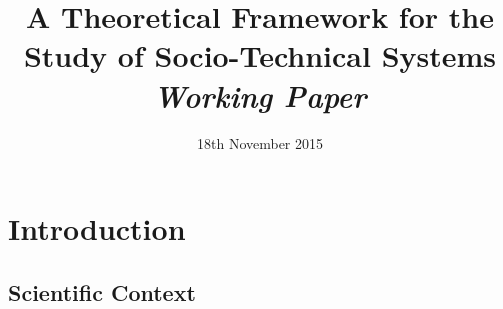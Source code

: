 


\title{
A Theoretical Framework for the Study of Socio-Technical Systems
\bigskip\\
\textit{Working Paper}
}
\author{}
\date{18th November 2015}


\maketitle

\justify


\begin{abstract}

\end{abstract}



\section*{Introduction}

\subsection*{Scientific Context}

